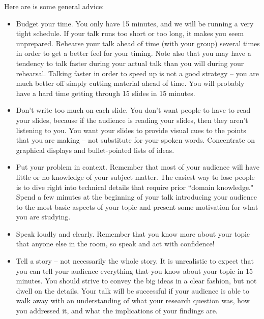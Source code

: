 \documentclass[10pt]{article}
\begin{document}
Here are is some general advice:
	\begin{itemize}
		\item Budget your time. You only have 15 minutes, and we will be running a very tight schedule. If your talk runs too short or too long, it makes you seem unprepared. Rehearse your talk ahead of time (with your group) several times in order to get a better feel for your timing. Note also that you may have a tendency to talk faster during your actual talk than you will during your rehearsal. Talking faster in order to speed up is not a good strategy -- you are much better off simply cutting material ahead of time. You will probably have a hard time getting through 15 slides in 15 minutes. 
		\item Don't write too much on each slide. You don't want people to have to read your slides, because if the audience is reading your slides, then they aren't listening to you. You want your slides to provide visual cues to the points that you are making -- not substitute for your spoken words. Concentrate on graphical displays and bullet-pointed lists of ideas. 
		\item Put your problem in context. Remember that most of your audience will have little or no knowledge of your subject matter. The easiest way to lose people is to dive right into technical details that require prior ``domain knowledge." Spend a few minutes at the beginning of your talk introducing your audience to the most basic aspects of your topic and present some motivation for what you are studying. 
		\item Speak loudly and clearly. Remember that you know more about your topic that anyone else in the room, so speak and act with confidence!
		\item Tell a story -- not necessarily the whole story. It is unrealistic to expect that you can tell your audience everything that you know about your topic in 15 minutes. You should strive to convey the big ideas in a clear fashion, but not dwell on the details. Your talk will be successful if your audience is able to walk away with an understanding of what your research question was, how you addressed it, and what the implications of your findings are. 
	\end{itemize}
\end{document}
